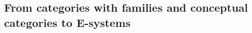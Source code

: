 \begin{comment}
In the following definition $\Delta(X)$ denotes the discrete category on the set
$X$ and $\mathbf{2}$ is the category $s\to t$.
\begin{defn}
Define $\mathbb{S}$ to be the pushout
\begin{equation*}
\begin{tikzcd}[column sep=large]
\Delta(\mathbb{N}) \arrow[r,"{n\mapsto(n,s)}"] \arrow[d,swap,"i"] & \Delta(\mathbb{N})\times\mathbf{2} \arrow[d] \\
(\mathbb{N},\leq) \arrow[r] & \mathbb{S}
\end{tikzcd}
\end{equation*}
in $\mathbf{Cat}$.
\end{defn}

Note that for any $n\in\mathbb{N}$, we have the map $S^n := (m\mapsto m+n)$ which
is monotone. By the universal property of pushouts, we obtain a functor $\sigma^n:\mathbb{S}\to\mathbb{S}$
given by
\begin{equation*}
\begin{tikzcd}[column sep=huge]
\Delta(\mathbb{N}) 
  \arrow[r,"{n\mapsto(n,s)}"] 
  \arrow[d,swap,"i"] 
  & 
\Delta(\mathbb{N})\times\mathbf{2} 
  \arrow[d]
  \arrow[r,"{\Delta(S^n)\times\catid{\mathbf{2}}}"]
  &
\Delta(\mathbb{N})\times\mathbf{2}
  \arrow[dd]
  \\
(\mathbb{N},\leq) 
  \arrow[r] 
  \arrow[d,swap,"{(S^n,\leq)}"]
  & 
\mathbb{S}
  \arrow[dr,densely dotted,yshift=.5ex,"\sigma^n"]
  \\
(\mathbb{N},\leq)
  \arrow[rr] & &
\mathbb{S}
\end{tikzcd}
\end{equation*}

\begin{defn}
A non-unital pre-B0-system is a presheaf $B$ on $\mathbb{S}$ such that $B(0)$ is
a singleton, and the following additional structure:
\begin{enumerate}
\item For any $n\in\mathbb{N}$ and $X\in B(n)$, write $B/X$ for the sub-presheaf
of $B\circ\sigma^n$ given by $B/X(0)=\{X\}$ and $B/X(n+1)=B_{n\leq n+1}^{-1}(B/X(n))$. 
We require that for any $n\in\mathbb{N}$ and any $A\in B(n+1)$, there is a 
natural transformation $W_A:B/(B_{n\leq n+1}(A))\Rightarrow B/A$.
\end{enumerate}
\end{defn}
\end{comment}

\subsection{From categories with families and conceptual categories to E-systems}

